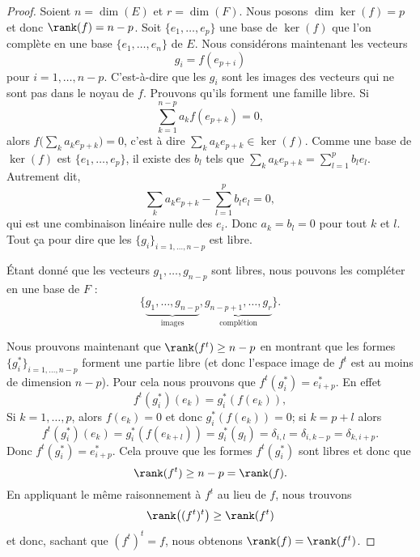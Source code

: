 \begin{proof}
	Soient \( n=\dim(E)\) et \( r=\dim(F)\).
	Nous posons \( \dim\ker(f)=p\) et donc \( \rank(f)=n-p\). Soit \( \{ e_1,\ldots, e_p \}\) une base de \( \ker(f)\) que l'on complète en une base \( \{ e_1,\ldots, e_n \}\) de \( E\). Nous considérons maintenant les vecteurs
	\begin{equation}
		g_i=f(e_{p+i})
	\end{equation}
	pour \( i=1,\ldots, n-p\). C'est-à-dire que les \( g_i\) sont les images des vecteurs qui ne sont pas dans le noyau de \( f\). Prouvons qu'ils forment une famille libre. Si
	\begin{equation}
		\sum_{k=1}^{n-p}a_kf(e_{p+k})=0,
	\end{equation}
	alors \( f\big( \sum_ka_ke_{p+k} \big)=0\), c'est à dire \( \sum_ka_ke_{p+k}\in\ker(f)\). Comme une base de \( \ker(f)\) est \( \{ e_1,\ldots, e_p \}\), il existe des \( b_l\) tels que \( \sum_{k}a_ke_{p+k}=\sum_{l=1}^pb_le_l\). Autrement dit,
	\begin{equation}
		\sum_{k}a_ke_{p+k}-\sum_{l=1}^pb_le_l=0,
	\end{equation}
	qui est une combinaison linéaire nulle des \( e_i\). Donc \( a_k=b_l=0\) pour tout \( k\) et \( l\). Tout ça pour dire que les \( \{ g_i \}_{i=1,\ldots, n-p}\) est libre.

	Étant donné que les vecteurs \( g_1,\ldots, g_{n-p}\) sont libres, nous pouvons les compléter en une base de \( F\) :
	\begin{equation}
		\{ \underbrace{g_1,\ldots, g_{n-p}}_{\text{images}},\underbrace{g_{n-p+1},\ldots, g_r}_{\text{complétion}} \}.
	\end{equation}

	Nous prouvons maintenant que \( \rank(f^t)\geq n-p\) en montrant que les formes \( \{ g_i^* \}_{i=1,\ldots, n-p}\) forment une partie libre (et donc l'espace image de \( f^t\) est au moins de dimension \( n-p\)). Pour cela nous prouvons que \( f^t(g_i^*)=e^*_{i+p}\). En effet
	\begin{equation}
		f^t(g^*_i)(e_k)=g_i^*(f(e_k)),
	\end{equation}
	Si \( k=1,\ldots, p\), alors \( f(e_k)=0\) et donc \( g_i^*(f(e_k))=0\); si \( k=p+l\) alors
	\begin{equation}
		f^t(g_i^*)(e_k)=g_i^*(f(e_{k+l}))=g^*_i(g_l)=\delta_{i,l}=\delta_{i,k-p}=\delta_{k,i+p}.
	\end{equation}
	Donc \( f^t(g_i^*)=e^*_{i+p}\). Cela prouve que les formes \( f^t(g_i^*)\) sont libres et donc que
	\begin{equation}
		\rank(f^t)\geq n-p=\rank(f).
	\end{equation}
	En appliquant le même raisonnement à \( f^t\) au lieu de \( f\), nous trouvons
	\begin{equation}
		\rank\big( (f^t)^t \big)\geq \rank(f^t)
	\end{equation}
	et donc, sachant que \( (f^t)^t=f\), nous obtenons \( \rank(f)=\rank(f^t)\).

\end{proof}

